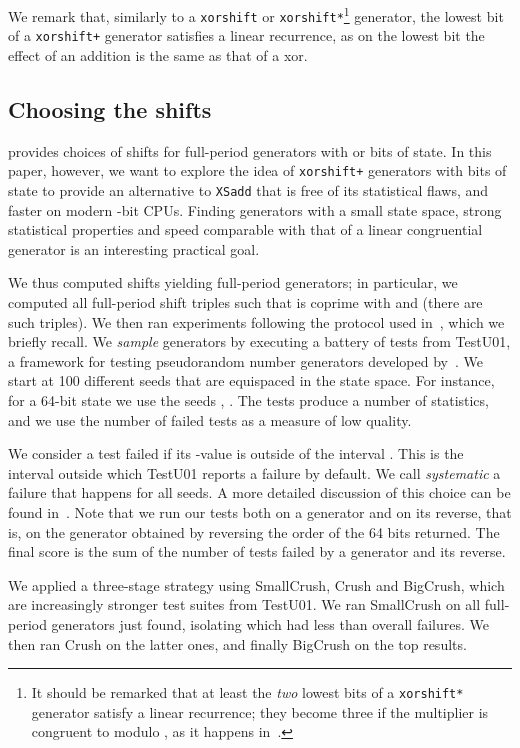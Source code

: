 \documentclass{acmsmalltr}
\newcommand{\xorshift}[1][]{\texttt{xorshift#1}\xspace}
\newcommand{\xorshifts}[1][]{\texttt{xorshift#1*}\xspace}
\newcommand{\xorshiftp}[1][]{\texttt{xorshift#1+}\xspace}
\newcommand{\xsadd}{\texttt{XSadd}\xspace}
\begin{document}
We remark that, similarly to a \xorshift or \xorshifts\footnote{It should
be remarked that at least the \emph{two} lowest bits of a \xorshifts
generator satisfy a linear recurrence; they become three if the multiplier
is congruent to  modulo , as it happens in~\cite{VigEEMXGS}.}
generator, the lowest bit of a \xorshiftp generator satisfies a linear
recurrence, as on the lowest bit the effect of an addition is the same as
that of a xor.

\subsection{Choosing the shifts}
\label{sec:setup}

 provides choices of shifts for full-period
generators with  or  bits of state. In this paper, however, we want
to explore the idea of \xorshiftp generators with  bits of state to provide
an alternative to \xsadd that is free of its statistical flaws, and faster on
modern -bit CPUs. Finding generators with a small state space, strong
statistical properties and speed comparable with that of a linear congruential
generator is an interesting practical goal.

We thus computed shifts yielding full-period generators;
in particular, we computed all full-period shift triples such that  is coprime
with  and  (there are  such triples).
We then ran experiments following the protocol used in~\cite{VigEEMXGS},
which we briefly recall. We \emph{sample} generators by executing a battery
of tests from TestU01, a framework for testing pseudorandom number
generators developed by~. We start at 100 different seeds that
are equispaced in the state space. For instance, for a 64-bit state we use the seeds , . The tests produce a number of statistics, and
we use the number of failed tests as a measure of low quality.

We consider a test failed if its -value is outside of the interval
. This is the interval outside which TestU01 reports a failure by default. 
We call \emph{systematic} a failure
that happens for all seeds. A more detailed discussion of this choice can be found in~\cite{VigEEMXGS}.
Note that we run our tests both on a generator and on its
reverse, that is, on the generator obtained by reversing the
order of the 64 bits returned. The final score is the sum of the number of tests
failed by a generator and its reverse.

We applied a three-stage strategy using SmallCrush, Crush and BigCrush,
which are increasingly stronger test suites from TestU01. We ran SmallCrush on
all  full-period generators just found, isolating  which had less than
 overall failures. We then ran Crush on the latter ones, and finally
BigCrush on the top  results. 
\end{document}
